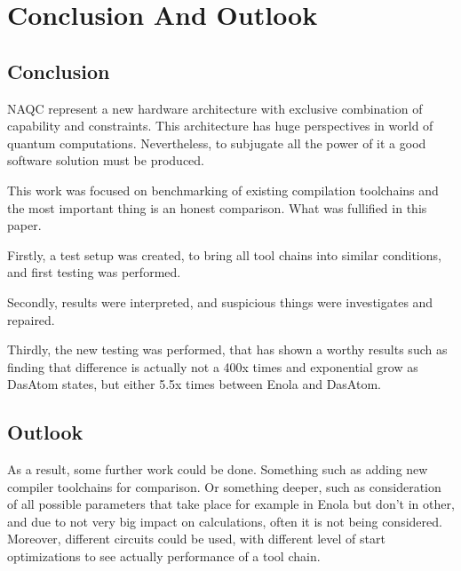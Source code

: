 
\chapter{Conclusion And Outlook}\label{chapter:conclusion}
\section{Conclusion}
\ac{NAQC} represent a new hardware architecture with exclusive combination of capability and constraints.
This architecture has huge perspectives in world of quantum computations. 
Nevertheless, to subjugate all the power of it a good software solution must be produced.

This work was focused on benchmarking of existing compilation toolchains 
and the most important thing is an honest comparison. What was fullified in this paper.

Firstly, a test setup was created, to bring all tool chains into similar conditions, and first testing was performed.

Secondly, results were interpreted, and suspicious things were investigates and repaired.

Thirdly, the new testing was performed, that has shown a worthy results 
such as finding that difference is actually not a 400x times and exponential grow as DasAtom \parencite{huang2025dasatomdivideandshuttleatomapproach} states, 
but either 5.5x times between Enola and DasAtom. 
\section{Outlook}
As a result, some further work could be done. Something such as adding new compiler toolchains for comparison.
Or something deeper, 
such as consideration of all possible parameters that take place for example in Enola but don't in other,
and due to not very big impact on calculations, often it is not being considered.
Moreover, different circuits could be used, with different level of start optimizations to see actually performance of a tool chain.